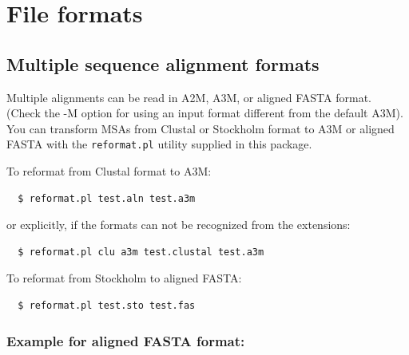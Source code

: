 \documentclass[11pt,a4paper]{article}
\begin{document}
\section{File formats}

\subsection{Multiple sequence alignment formats} \label{aliformats}

Multiple alignments can be read in A2M, A3M, or aligned FASTA format. (Check the -M option for 
using an input format different from the default A3M). You can transform MSAs 
from Clustal or Stockholm format to A3M or aligned FASTA with the \verb`reformat.pl` utility 
supplied in this package. 

To reformat from Clustal format to A3M:
\begin{verbatim}
  $ reformat.pl test.aln test.a3m
\end{verbatim}
or explicitly, if the formats can not be recognized from the extensions:
\begin{verbatim}
  $ reformat.pl clu a3m test.clustal test.a3m
\end{verbatim}
To reformat from Stockholm to aligned FASTA:
\begin{verbatim}
  $ reformat.pl test.sto test.fas
\end{verbatim}


\subsubsection*{Example for aligned FASTA format:}
\end{document}
